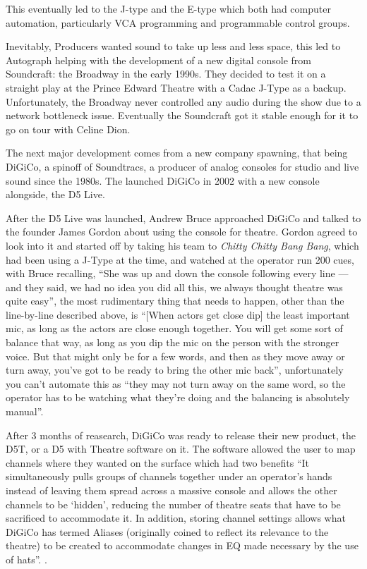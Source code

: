 \documentclass[12pt]{article}
\def\dg{DiGiCo}
\begin{document}
\begin{doublespace}
This eventually led to the J-type and the E-type which both had computer automation, particularly VCA programming and programmable control groups.
\par Inevitably, Producers wanted sound to take up less and less space, this led to Autograph helping with the development of a new digital console from Soundcraft: the Broadway in the early 1990s. They decided to test it on a straight play at the Prince Edward Theatre with a Cadac J-Type as a backup. Unfortunately, the Broadway never controlled any audio during the show due to a network bottleneck issue. Eventually the Soundcraft got it stable enough for it to go on tour with Celine Dion.\autocite{bruceTheatreSoundDigital}
\par The next major development comes from a new company spawning, that being DiGiCo, a spinoff of Soundtracs, a producer of analog consoles for studio and live sound since the 1980s. The launched \dg{} in 2002 with a new console alongside, the D5 Live.\autocite{gillmoreBriefHistoryTheatre2016}
\par After the D5 Live was launched, Andrew Bruce approached \dg{} and talked to the founder James Gordon about using the console for theatre. Gordon agreed to look into it and started off by taking his team to \textit{Chitty Chitty Bang Bang}, which had been using a J-Type at the time, and watched at the operator run 200 cues, with Bruce recalling, ``She was up and down the console following every line --- and they said, we had no idea you did all this, we always thought theatre was quite easy''\autocite{bruceAndrewBruceMusical}, the most rudimentary thing that needs to happen, other than the line-by-line described above, is ``[When actors get close dip] the least important mic, as long as the actors are close enough together. You will get some sort of balance that way, as long as you dip the mic on the person with the stronger voice. But that might only be for a few words, and then as they move away or turn away, you've got to be ready to bring the other mic back'', unfortunately you can't automate this as ``they may not turn away on the same word, so the operator has to be watching what they're doing and the balancing is absolutely manual''.\autocite{bruceAndrewBruceMusical}
\par After 3 months of reasearch, \dg{} was ready to release their new product, the D5T, or a D5 with Theatre software on it. The software allowed the user to map channels where they wanted on the surface which had two benefits ``It simultaneously pulls groups of channels together under an operator's hands instead of leaving them spread across a massive console and allows the other channels to be `hidden', reducing the number of theatre seats that have to be sacrificed to accommodate it. In addition, storing channel settings allows what DiGiCo has termed Aliases (originally coined to reflect its relevance to the theatre) to be created to accommodate changes in EQ made necessary by the use of hats''. \autocite{bruceAndrewBruceMusical}.

\end{doublespace}
\end{document}
